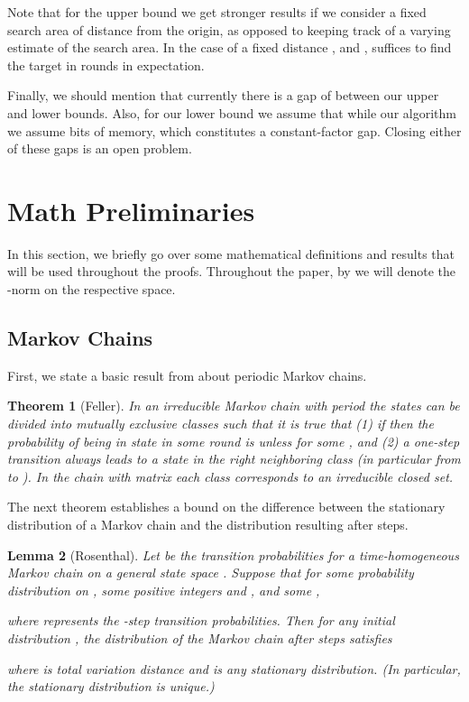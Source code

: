 \documentclass[11pt]{article}
\newtheorem{theorem}{Theorem}[section]
\newtheorem{lemma}[theorem]{Lemma}
\begin{document}
Note that for the upper bound we get stronger results if we consider a fixed search area of distance  from the origin, as opposed to keeping track of a varying estimate of the search area. In the case of a fixed distance , and , suffices to find the target in  rounds in expectation.

Finally, we should mention that currently there is a gap of  between our upper and lower bounds. Also, for our lower bound we assume that  while our algorithm we assume  bits of memory, which constitutes a constant-factor gap. Closing either of these gaps is an open problem.





\appendix

\section{Math Preliminaries}
\label{sec:math}

In this section, we briefly go over some mathematical definitions and results that will be used throughout the proofs. Throughout the paper, by  we will denote the -norm on the respective space.

\subsection{Markov Chains}

First, we state a basic result from \cite{feller68} about periodic Markov chains.

\begin{theorem}[Feller]
\label{thm:feller}
	In an irreducible Markov chain with period  the states can be divided into  mutually exclusive classes  such that it is true that (1) if  then the probability of being in state  in some round  is  unless  for some , and (2) a one-step transition always leads to a state in the right neighboring class (in particular from  to ). In the chain with matrix  each class  corresponds to an irreducible closed set.
\end{theorem}

The next theorem establishes a bound on the difference between the stationary distribution of a Markov chain and the distribution resulting after  steps.

\begin{lemma}[Rosenthal]
\label{lem:rosenthal}
	Let  be the transition probabilities for a time-homogeneous Markov chain on a general state space . Suppose that for some probability distribution  on , some positive integers  and , and some , 
			
where  represents the -step transition probabilities. 
Then for any initial distribution , the distribution  of the Markov chain after  steps satisfies

	 
where  is total variation distance and  is any stationary distribution. (In particular, the stationary distribution is unique.)
\end{lemma}
\end{document}

